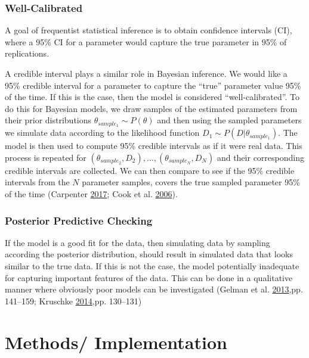 \documentclass[11pt,a4paper]{article}
\numberwithin{equation}{section}
\begin{document}
\hypertarget{well-calibrated}{%
\subsubsection{Well-Calibrated}\label{well-calibrated}}

A goal of frequentist statistical inference is to obtain confidence
intervals (CI), where a 95\% CI for a parameter would capture the true
parameter in 95\% of replications.

A credible interval plays a similar role in Bayesian inference. We would
like a 95\% credible interval for a parameter to capture the ``true''
parameter value 95\% of the time. If this is the case, then the model is
considered ``well-calibrated''. To do this for Bayesian models, we draw
samples of the estimated parameters from their prior distributions
\(\theta_{sample_1} \sim P(\theta)\) and then using the sampled
parameters we simulate data according to the likelihood function
\(D_{1} \sim P(D|\theta_{sample_1})\). The model is then used to compute
95\% credible intervals as if it were real data. This process is
repeated for
\((\theta_{sample_2}, D_2), \dots, (\theta_{sample_N}, D_N)\) and their
corresponding credible intervals are collected. We can then compare to
see if the 95\% credible intervals from the \(N\) parameter samples,
covers the true sampled parameter 95\% of the time (Carpenter
\protect\hyperlink{ref-carpenter_bayesian_2017}{2017}; Cook et al.
\protect\hyperlink{ref-cook_validation_2006}{2006}).

\hypertarget{posterior-predictive-checking}{%
\subsubsection{Posterior Predictive
Checking}\label{posterior-predictive-checking}}

If the model is a good fit for the data, then simulating data by
sampling according the posterior distribution, should result in
simulated data that looks similar to the true data. If this is not the
case, the model potentially inadequate for capturing important features
of the data. This can be done in a qualitative manner where obviously
poor models can be investigated (Gelman et al.
\protect\hyperlink{ref-gelman_bayesian_2013}{2013},pp. 141--159;
Kruschke \protect\hyperlink{ref-kruschke_doing_2014}{2014},pp. 130--131)

\hypertarget{methods}{%
\section{Methods/ Implementation}\label{methods}}
\end{document}

